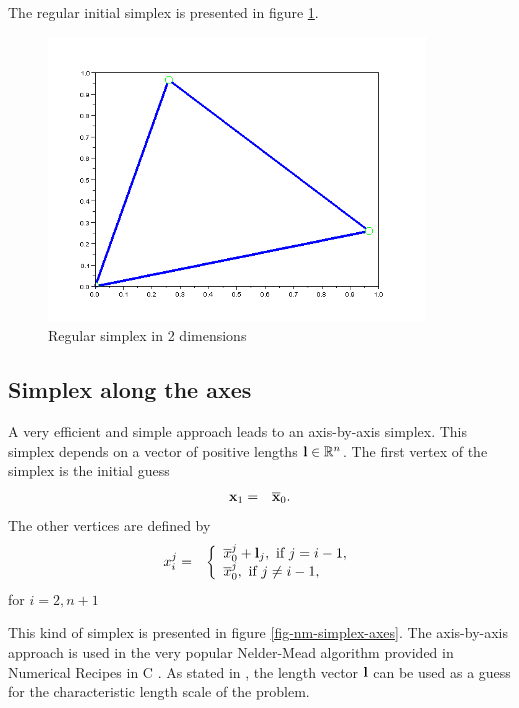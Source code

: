 The regular initial simplex is presented in figure \ref{fig-nm-simplex-regular}.

\begin{figure}
\begin{center}
\includegraphics[width=10cm]{simplex_regular.png}
\end{center}
\caption{Regular simplex in 2 dimensions}
\label{fig-nm-simplex-regular}
\end{figure}

\subsection{Simplex along the axes}

A very efficient and simple approach leads to an axis-by-axis simplex.
This simplex depends on a vector of positive lengths $\mathbf{l}\in\mathbb{R}^n$.
The first vertex of the simplex is the initial guess 
\begin{eqnarray}
\mathbf{x}_1 &=& \overline{\mathbf{x}}_0.
\end{eqnarray}
The other vertices are defined by 
\begin{eqnarray}
x_i^j &=& 
\left\{
\begin{array}{l}
\overline{x}_0^j + \mathbf{l}_j, \textrm{ if } j=i-1,\\
\overline{x}_0^j, \textrm{ if } j\neq i-1,\\
\end{array}
\right.
\end{eqnarray}
for $i=2,n+1$ 

This kind of simplex is presented in figure \ref{fig-nm-simplex-axes}.
The axis-by-axis approach is used in the very popular Nelder-Mead 
algorithm provided in Numerical Recipes in C \cite{NumericalRecipes}.
As stated in \cite{NumericalRecipes}, the length vector $\mathbf{l}$ can 
be used as a guess for the characteristic length scale of the problem.

